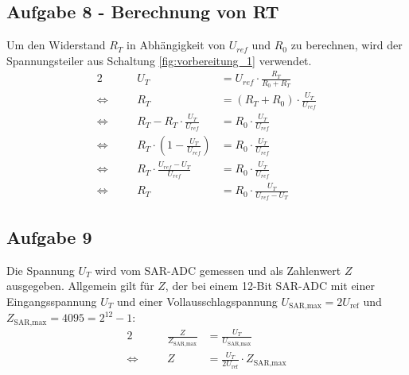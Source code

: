 \subsection{Aufgabe 8 - Berechnung von RT}
Um den Widerstand $R_T$ in Abhängigkeit von $U_{ref}$ und $R_0$ zu berechnen, wird der Spannungsteiler aus Schaltung \ref{fig:vorbereitung_1} verwendet.
\begin{alignat}{2}
    \label{eqn:a8}
                    & \quad & U_{T}                                            & = U_{ref} \cdot \frac{R_T}{R_0 + R_T} \nonumber   \\
    \Leftrightarrow &       & R_T                                              & = (R_T + R_0) \cdot \frac{U_T}{U_{ref}} \nonumber \\
    \Leftrightarrow &       & R_T - R_T \cdot \frac{U_T}{U_{ref}}              & = R_0 \cdot \frac{U_T}{U_{ref}} \nonumber         \\
    \Leftrightarrow &       & R_T \cdot \left( 1 - \frac{U_T}{U_{ref}} \right) & = R_0 \cdot \frac{U_T}{U_{ref}}                   \\
    \Leftrightarrow &       & R_T \cdot \frac{U_{ref} - U_T}{U_{ref}}          & = R_0 \cdot \frac{U_T}{U_{ref}} \nonumber         \\
    \Leftrightarrow &       & R_T                                              & = R_0 \cdot \frac{U_T}{U_{ref} - U_T} \nonumber
\end{alignat}

\subsection{Aufgabe 9}
Die Spannung $U_T$ wird vom SAR-ADC gemessen und als Zahlenwert $Z$ ausgegeben. Allgemein gilt für $Z$, der bei einem 12-Bit SAR-ADC mit einer Eingangsspannung $U_T$ und einer Vollausschlagspannung $U_{\text{SAR,max}} = 2U_{\text{ref}}$ und $Z_{\text{SAR,max}} = 4095 = 2^{12} - 1$:
\begin{alignat}{2}
    \label{eqn:a9}
                    & \quad & \frac{Z}{Z_{\text{SAR,max}}} & = \frac{U_T}{U_{\text{SAR,max}}}                                 \\
    \Leftrightarrow &       & Z                            & = \frac{U_T}{2U_{\text{ref}}} \cdot Z_{\text{SAR,max}} \nonumber
\end{alignat}

